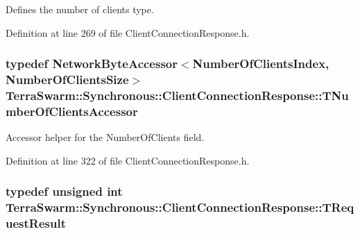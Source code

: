 Defines the number of clients type. 



Definition at line 269 of file Client\-Connection\-Response.\-h.

\hypertarget{class_terra_swarm_1_1_synchronous_1_1_client_connection_response_ac029cc8910297215aa037106589ec9c2}{
\subsubsection[{T\-Number\-Of\-Clients\-Accessor}]{\setlength{\rightskip}{0pt plus 5cm}typedef {\bf Network\-Byte\-Accessor}$<${\bf Number\-Of\-Clients\-Index}, {\bf Number\-Of\-Clients\-Size}$>$ {\bf Terra\-Swarm\-::\-Synchronous\-::\-Client\-Connection\-Response\-::\-T\-Number\-Of\-Clients\-Accessor}\hspace{0.3cm}{\ttfamily [private]}}}\label{class_terra_swarm_1_1_synchronous_1_1_client_connection_response_ac029cc8910297215aa037106589ec9c2}


Accessor helper for the Number\-Of\-Clients field. 



Definition at line 322 of file Client\-Connection\-Response.\-h.

\hypertarget{class_terra_swarm_1_1_synchronous_1_1_client_connection_response_a4b55c1f852e288564e5aa00e882f80d5}{
\subsubsection[{T\-Request\-Result}]{\setlength{\rightskip}{0pt plus 5cm}typedef unsigned int {\bf Terra\-Swarm\-::\-Synchronous\-::\-Client\-Connection\-Response\-::\-T\-Request\-Result}}}\label{class_terra_swarm_1_1_synchronous_1_1_client_connection_response_a4b55c1f852e288564e5aa00e882f80d5}


